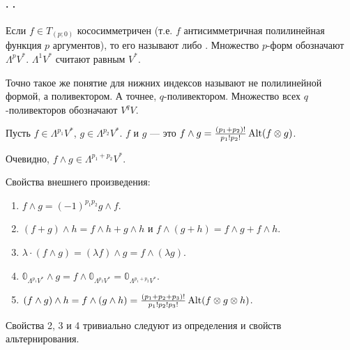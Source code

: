 \documentclass{article}
\begin{document}
    \paragraph{. .}
    \begin{itemize}
        \dfn Если $f\in T_{(p;0)}$ кососимметричен (т.е. $f$ антисимметричная полилинейная функция $p$ аргументов), то его называют  либо . Множество $p$-форм обозначают $\Lambda^pV^*$. $\Lambda^1V^*$ считают равным $V^*$.
        \begin{Proof}
            Точно такое же понятие для нижних индексов называют не полилинейной формой, а поливектором. А точнее, $q$-поливектором. Множество всех $q$-поливекторов обозначают $V^qV$.
        \end{Proof}
        \dfn Пусть $f\in\Lambda^{p_1}V^*$, $g\in\Lambda^{p_2}V^*$.  $f$ и $g$ --- это $f\land g=\frac{(p_1+p_2)!}{p_1!p_2!}\operatorname{Alt}(f\otimes g)$.
        \begin{Comment}
            Очевидно, $f\land g\in\Lambda^{p_1+p_2}V^*$.
        \end{Comment}
        \thm Свойства внешнего произведения:
        \begin{enumerate}
            \item $f\land g=(-1)^{p_1p_2}g\land f$.
            \item $(f+g)\land h=f\land h+g\land h$ и $f\land(g+h)=f\land g+f\land h$.
            \item $\lambda\cdot(f\land g)=(\lambda f)\land g=f\land(\lambda g)$.
            \item $\mathbb0_{\Lambda^{p_1}V^*}\land g=f\land\mathbb0_{\Lambda^{p_2}V^*}=\mathbb0_{\Lambda^{p_1+p_2}V^*}$.
            \item $(f\land g)\land h=f\land(g\land h)=\frac{(p_1+p_2+p_3)!}{p_1!p_2!p_3!}\operatorname{Alt}(f\otimes g\otimes h)$.
        \end{enumerate}
        \begin{Proof}
            Свойства 2, 3 и 4 тривиально следуют из определения и свойств альтернирования.\\

\end{Proof}
\end{itemize}
\end{document}

